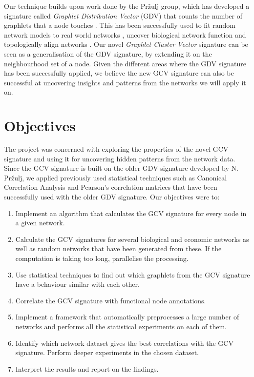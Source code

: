 Our technique builds upon work done by the Pr\v{z}ulj group, which has developed a signature called \emph{Graphlet Distribution Vector} (GDV) that counts the number of graphlets that a node touches \cite{prvzulj2007biological}. This has been successfully used to fit random network models to real world networks \cite{prvzulj2004modeling}, uncover biological network function \cite{milenkoviae2008uncovering} and topologically align networks \cite{kuchaiev2010topological}. Our novel \emph{Graphlet Cluster Vector} signature can be seen as a generalisation of the GDV signature, by extending it on the neighbourhood set of a node. Given the different areas where the GDV signature has been successfully applied, we believe the new GCV signature can also be successful at uncovering insights and patterns from the networks we will apply it on. 

\section{Objectives}

The project was concerned with exploring the properties of the novel GCV signature and using it for uncovering hidden patterns from the network data. Since the GCV signature is built on the older GDV signature developed by N. Pr\v{z}ulj, we applied previously used statistical techniques such as Canonical Correlation Analysis and Pearson's correlation matrices that have been successfully used with the older GDV signature. Our objectives were to:
\begin{enumerate}
 \item Implement an algorithm that calculates the GCV signature for every node in a given network.
 \item Calculate the GCV signatures for several biological and economic networks as well as random networks that have been generated from these. If the computation is taking too long, parallelise the processing.
 \item Use statistical techniques to find out which graphlets from the GCV signature have a behaviour similar with each other.
 \item Correlate the GCV signature with functional node annotations.
 \item Implement a framework that automatically preprocesses a large number of networks and performs all the statistical experiments on each of them.
 \item Identify which network dataset gives the best correlations with the GCV signature. Perform deeper experiments in the chosen dataset. 
 \item Interpret the results and report on the findings.
\end{enumerate}

